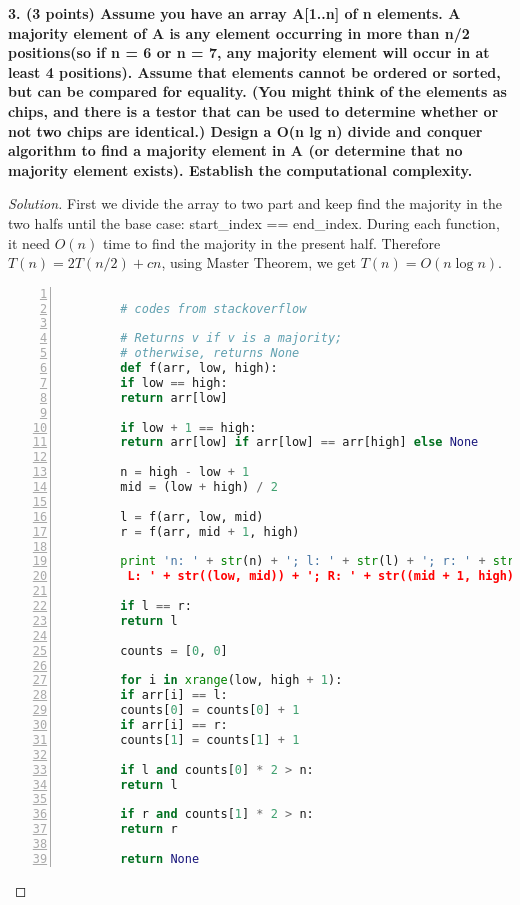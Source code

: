 \documentclass[12pt]{article}
\begin{document}
\textbf{3. (3 points) Assume you have an array A[1..n] of n elements. A majority element of A is any element occurring in more than n/2 positions(so if n = 6 or n = 7, any majority element will occur in at least 4 positions). Assume that elements cannot be ordered or sorted, but can be compared for equality. (You might think of the elements as chips, and there is a testor that can be used to determine whether or not two chips are identical.) Design a O(n lg n) divide and conquer algorithm to find a majority element in A (or determine that no majority element exists). Establish the computational complexity.}
\begin{proof}[Solution]
	First we divide the array to two part and keep find the majority in the two halfs until the base case: start\_index == end\_index. During each function, it need $O(n)$ time to find the majority in the present half. Therefore $T(n)=2T(n/2)+cn$, using Master Theorem, we get $T(n) = O(n\log n)$.
	\begin{lstlisting}[language={python},numbers=left,numberstyle=\tiny,%frame=shadowbox,  
		rulesepcolor=\color{red!20!green!20!blue!20},  
		keywordstyle=\color{blue!70!black},  
		commentstyle=\color{blue!90!},  
		basicstyle=\ttfamily]  
		
		# codes from stackoverflow
		
		# Returns v if v is a majority;
		# otherwise, returns None
		def f(arr, low, high):
		if low == high:
		return arr[low]
		
		if low + 1 == high:
		return arr[low] if arr[low] == arr[high] else None
		
		n = high - low + 1
		mid = (low + high) / 2
		
		l = f(arr, low, mid)
		r = f(arr, mid + 1, high)
		
		print 'n: ' + str(n) + '; l: ' + str(l) + '; r: ' + str(r) + ';
		 L: ' + str((low, mid)) + '; R: ' + str((mid + 1, high))
		
		if l == r:
		return l
		
		counts = [0, 0]
		
		for i in xrange(low, high + 1):
		if arr[i] == l:
		counts[0] = counts[0] + 1
		if arr[i] == r:
		counts[1] = counts[1] + 1
		
		if l and counts[0] * 2 > n:
		return l
		
		if r and counts[1] * 2 > n:
		return r
		
		return None
	\end{lstlisting}
\end{proof}
\end{document}
